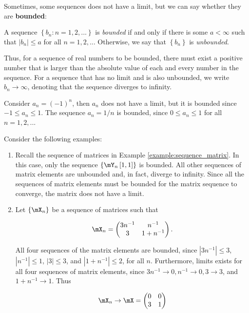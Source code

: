 \documentclass[english,12pt]{book}\usepackage[]{graphicx}\usepackage[]{xcolor}
\begin{document}
Sometimes, some sequences does not have a limit, but we can say whether they are \textbf{bounded}: 

\begin{definition}\label{definition:bounded_sequence}
 A  sequence $\left\lbrace b_n: n = 1,2,... \right\rbrace$ is \emph{bounded} if and only if there is some $a < \infty$ such that $\left|b_n\right|\leq a$ for all $n = 1,2,...$ Otherwise, we say that $\left\lbrace b_n \right\rbrace$ is \emph{unbounded}.
\end{definition}

Thus, for a sequence of real numbers to be bounded, there must exist a positive number that is larger than the absolute value of each and every number in the sequence. For a sequence that has no limit and is also unbounded, we write $b_n \to \infty$, denoting that the sequence diverges to infinity. 


\begin{example}
Consider $a_n = (-1)^n$, then $a_n$ does not have a limit, but it is bounded since $-1 \leq a_n \leq 1$. The sequence $a_n = 1/n$ is bounded, since $0 \leq a_n\leq 1$ for all $n = 1,2,...$
\end{example}


\begin{example}
Consider the following examples:
\begin{enumerate}
 \item Recall the sequence of matrices in Example \ref{example:sequence_matrix}. In this case, only the sequence $\left\lbrace \mY_n\left[1, 1\right]\right\rbrace$ is bounded. All other sequences of matrix elements are unbounded and, in fact, diverge to infinity. Since all the sequences of matrix elements must be bounded for the matrix sequence to converge, the matrix does not have a limit.
 \item Let $\left\lbrace \mX_n\right\rbrace$ be a sequence of matrices such that
 
\begin{equation*}
\mX_n = \begin{pmatrix}
  3n^{-1} & n^{-1} \\
  3       & 1 + n^{-1}
\end{pmatrix}.
\end{equation*}

All four sequences of the matrix elements are bounded, since $\left|3n^{-1}\right|\leq 3$, $\left|n^{-1}\right|\leq 1$, $\left|3\right|\leq 3$, and $\left|1 + n^{-1}\right|\leq 2$, for all $n$. Furthermore, limits exists for all four sequences of matrix elements, since $3n^{-1}\to 0, n^{-1}\to 0, 3\to 3$, and $1 + n^{-1}\to 1$. Thus 

\begin{equation*}
\mX_n\to \mX= \begin{pmatrix}
0 & 0 \\
3 & 1
\end{pmatrix}
\end{equation*}
 \end{enumerate}
\end{example}
\end{document}
